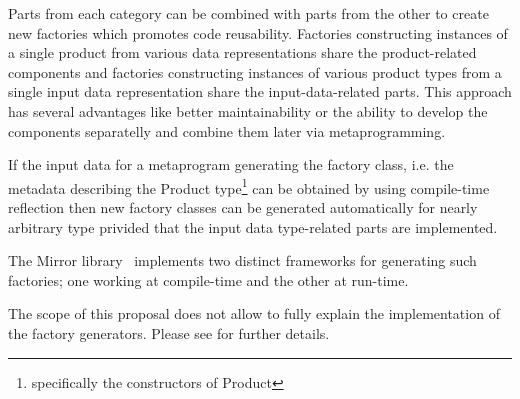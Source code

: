 Parts from each category can be combined with parts from the other to create new
factories which promotes code reusability. Factories constructing instances of a single
product from various data representations share the product-related components
and factories constructing instances of various product types from a single input data representation
share the input-data-related parts. This approach has several advantages like better
maintainability or the ability to develop the components separatelly and combine them later
via metaprogramming.

If the input data for a metaprogram generating the factory class,
i.e. the metadata describing the Product type\footnote{specifically the constructors of Product}
can be obtained by using compile-time reflection then new factory classes can be generated
automatically for nearly arbitrary type privided that the input data type-related parts are
implemented.

The Mirror library~\cite{mirror-doc-cpp11} implements two distinct frameworks for generating such factories;
one working at compile-time and the other at run-time.

The scope of this proposal does not allow to fully explain the implementation
of the factory generators. Please see \cite{ITFPWTHOR} for further details.
